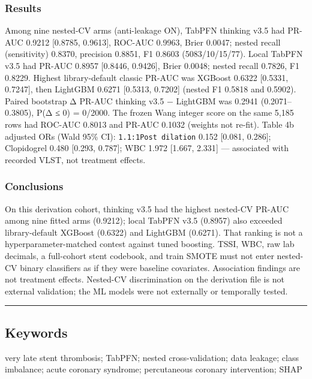 \documentclass[
]{article}
\begin{document}
\subsubsection{Results}\label{results}

Among nine nested-CV arms (anti-leakage ON), TabPFN thinking v3.5 had
PR-AUC 0.9212 {[}0.8785, 0.9613{]}, ROC-AUC 0.9963, Brier 0.0047; nested
recall (sensitivity) 0.8370, precision 0.8851, F1 0.8603
(5083/10/15/77). Local TabPFN v3.5 had PR-AUC 0.8957 {[}0.8446,
0.9426{]}, Brier 0.0048; nested recall 0.7826, F1 0.8229. Highest
library-default classic PR-AUC was XGBoost 0.6322 {[}0.5331, 0.7247{]},
then LightGBM 0.6271 {[}0.5313, 0.7202{]} (nested F1 0.5818 and 0.5902).
Paired bootstrap Δ PR-AUC thinking v3.5 − LightGBM was 0.2941
(0.2071--0.3805), P(Δ ≤ 0) = 0/2000. The frozen Wang integer score on
the same 5,185 rows had ROC-AUC 0.8013 and PR-AUC 0.1032 (weights not
re-fit). Table 4b adjusted ORs (Wald 95\% CI):
\texttt{1.1:1Post\ dilation} 0.152 {[}0.081, 0.286{]}; Clopidogrel 0.480
{[}0.293, 0.787{]}; WBC 1.972 {[}1.667, 2.331{]} --- associated with
recorded VLST, not treatment effects.

\subsubsection{Conclusions}\label{conclusions}

On this derivation cohort, thinking v3.5 had the highest nested-CV
PR-AUC among nine fitted arms (0.9212); local TabPFN v3.5 (0.8957) also
exceeded library-default XGBoost (0.6322) and LightGBM (0.6271). That
ranking is not a hyperparameter-matched contest against tuned boosting.
TSSI, WBC, raw lab decimals, a full-cohort stent codebook, and train
SMOTE must not enter nested-CV binary classifiers as if they were
baseline covariates. Association findings are not treatment effects.
Nested-CV discrimination on the derivation file is not external
validation; the ML models were not externally or temporally tested.

\begin{center}\rule{0.5\linewidth}{0.5pt}\end{center}

\subsection{Keywords}\label{keywords}

very late stent thrombosis; TabPFN; nested cross-validation; data
leakage; class imbalance; acute coronary syndrome; percutaneous coronary
intervention; SHAP
\end{document}
